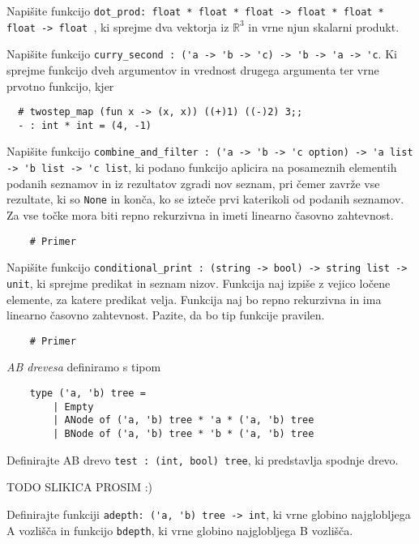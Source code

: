 \documentclass[arhiv]{../izpit}
\begin{document}
	
	

	\naloga 
  
	\podnaloga Napišite funkcijo \verb|dot_prod: float * float * float -> float * float * float -> float |, ki sprejme dva vektorja iz $\mathbb{R}^3$ in vrne njun skalarni produkt.
  
    \podnaloga Napišite funkcijo \verb|curry_second : ('a -> 'b -> 'c) -> 'b -> 'a -> 'c|. Ki sprejme funkcijo dveh argumentov in vrednost drugega argumenta ter vrne prvotno funkcijo, kjer 
  \begin{verbatim}
  # twostep_map (fun x -> (x, x)) ((+)1) ((-)2) 3;;
  - : int * int = (4, -1)
  \end{verbatim}
  
	\podnaloga Napišite funkcijo \verb|combine_and_filter : ('a -> 'b -> 'c option) -> 'a list -> 'b list -> 'c list|, ki podano funkcijo aplicira na posameznih elementih podanih seznamov in iz rezultatov zgradi nov seznam, pri čemer zavrže vse rezultate, ki so \verb|None| in konča, ko se izteče prvi katerikoli od podanih seznamov.  Za vse točke mora biti repno rekurzivna in imeti linearno časovno zahtevnost.
	\begin{verbatim}
	# Primer
	\end{verbatim}
	
	\podnaloga Napišite funkcijo \verb|conditional_print : (string -> bool) -> string list -> unit|, ki sprejme predikat in seznam nizov. Funkcija naj izpiše z vejico ločene elemente, za katere predikat velja. Funkcija naj bo repno rekurzivna in ima linearno časovno zahtevnost. Pazite, da bo tip funkcije pravilen.
	\begin{verbatim}
  	# Primer
	\end{verbatim}
  
  	\naloga
  
  	\textit{AB drevesa} definiramo s tipom
  	\begin{verbatim}
  	type ('a, 'b) tree = 
  		| Empty
  		| ANode of ('a, 'b) tree * 'a * ('a, 'b) tree
  		| BNode of ('a, 'b) tree * 'b * ('a, 'b) tree
  	\end{verbatim}
	\podnaloga Definirajte AB drevo \verb|test : (int, bool) tree|, ki predstavlja spodnje drevo.
	
	TODO SLIKICA PROSIM :)
	
	\podnaloga Definirajte funkciji \verb|adepth: ('a, 'b) tree -> int|, ki vrne globino najglobljega A vozlišča in funkcijo \verb|bdepth|, ki vrne globino najglobljega B vozlišča.
	
\end{document}
